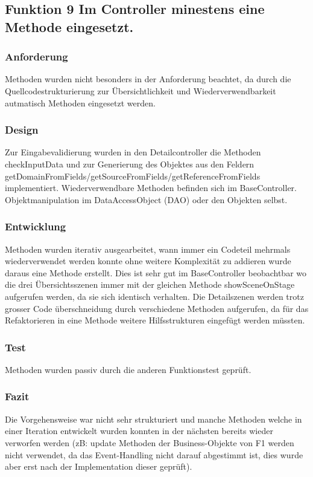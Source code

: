 \subsection[Funktion 9 Methode im Controller]{Funktion 9 Im Controller minestens eine Methode eingesetzt.}

\subsubsection{Anforderung}
Methoden wurden nicht besonders in der Anforderung beachtet, da durch die Quellcodestrukturierung zur Übersichtlichkeit und Wiederverwendbarkeit autmatisch Methoden eingesetzt werden.

\subsubsection{Design}
Zur Eingabevalidierung wurden in den Detailcontroller die Methoden checkInputData und zur Generierung des Objektes aus den Feldern getDomainFromFields/getSourceFromFields/getReferenceFromFields implementiert. Wiederverwendbare Methoden befinden sich im BaseController. Objektmanipulation im DataAccessObject (DAO) oder den Objekten selbst.

\subsubsection{Entwicklung}
Methoden wurden iterativ ausgearbeitet, wann immer ein Codeteil mehrmals wiederverwendet werden konnte ohne weitere Komplexität zu addieren wurde daraus eine Methode erstellt. Dies ist sehr gut im BaseController beobachtbar wo die drei Übersichtsszenen immer mit der gleichen Methode showSceneOnStage aufgerufen werden, da sie sich identisch verhalten. Die Detailszenen werden trotz grosser Code überschneidung durch verschiedene Methoden aufgerufen, da für das Refaktorieren in eine Methode weitere Hilfsstrukturen eingefügt werden müssten.

\subsubsection{Test}
Methoden wurden passiv durch die anderen Funktionstest geprüft.

\subsubsection{Fazit}
Die Vorgehensweise war nicht sehr strukturiert und manche Methoden welche in einer Iteration entwickelt wurden konnten in der nächsten bereits wieder verworfen werden (zB: update Methoden der Business-Objekte von F1 werden nicht verwendet, da das Event-Handling nicht darauf abgestimmt ist, dies wurde aber erst nach der Implementation dieser geprüft).